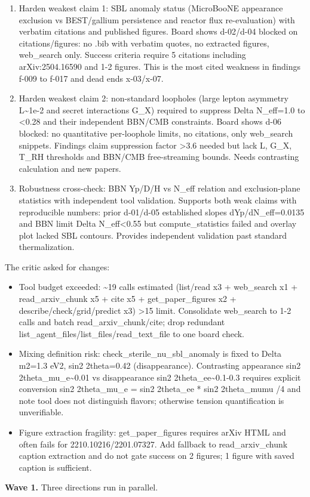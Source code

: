 \documentclass[11pt,a4paper]{article}
\begin{document}
\begin{enumerate}
  \item Harden weakest claim 1: SBL anomaly status (MicroBooNE appearance exclusion vs BEST/gallium persistence and reactor flux re-evaluation) with verbatim citations and published figures. Board shows d-02/d-04 blocked on citations/figures: no .bib with verbatim quotes, no extracted figures, web\_search only. Success criteria require 5 citations including arXiv:2504.16590 and 1-2 figures. This is the most cited weakness in findings f-009 to f-017 and dead ends x-03/x-07.
  \item Harden weakest claim 2: non-standard loopholes (large lepton asymmetry L\textasciitilde{}1e-2 and secret interactions G\_X) required to suppress Delta N\_eff=1.0 to \textless{}0.28 and their independent BBN/CMB constraints. Board shows d-06 blocked: no quantitative per-loophole limits, no citations, only web\_search snippets. Findings claim suppression factor \textgreater{}3.6 needed but lack L, G\_X, T\_RH thresholds and BBN/CMB free-streaming bounds. Needs contrasting calculation and new papers.
  \item Robustness cross-check: BBN Yp/D/H vs N\_eff relation and exclusion-plane statistics with independent tool validation. Supports both weak claims with reproducible numbers: prior d-01/d-05 established slopes dYp/dN\_eff=0.0135 and BBN limit Delta N\_eff\textless{}0.55 but compute\_statistics failed and overlay plot lacked SBL contours. Provides independent validation past standard thermalization.
\end{enumerate}
The critic asked for changes:

\begin{itemize}
  \item Tool budget exceeded: \textasciitilde{}19 calls estimated (list/read x3 + web\_search x1 + read\_arxiv\_chunk x5 + cite x5 + get\_paper\_figures x2 + describe/check/grid/predict x3) \textgreater{}15 limit. Consolidate web\_search to 1-2 calls and batch read\_arxiv\_chunk/cite; drop redundant list\_agent\_files/list\_files/read\_text\_file to one board check.
  \item Mixing definition risk: check\_sterile\_nu\_sbl\_anomaly is fixed to Delta m2=1.3 eV2, sin2 2theta=0.42 (disappearance). Contrasting appearance sin2 2theta\_mu\_e\textasciitilde{}0.01 vs disappearance sin2 2theta\_ee\textasciitilde{}0.1-0.3 requires explicit conversion sin2 2theta\_mu\_e = sin2 2theta\_ee * sin2 2theta\_mumu /4 and note tool does not distinguish flavors; otherwise tension quantification is unverifiable.
  \item Figure extraction fragility: get\_paper\_figures requires arXiv HTML and often fails for 2210.10216/2201.07327. Add fallback to read\_arxiv\_chunk caption extraction and do not gate success on 2 figures; 1 figure with saved caption is sufficient.
\end{itemize}
\textbf{Wave 1.} Three directions run in parallel.
\end{document}
